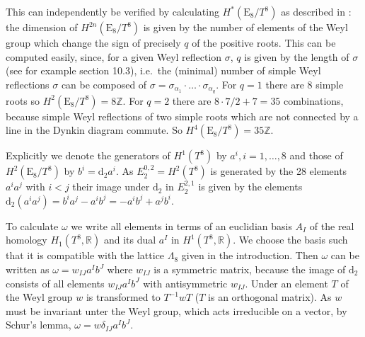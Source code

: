 \documentclass[a4paper,12pt,twoside]{article}
\numberwithin{equation}{section}
\newcommand{\pE}{\text{E}  }     %
\newcommand{\mR}{\mathbb{R}}
\newcommand{\mZ}{\mathbb{Z}}
\newcommand{\Dd}{\text{d}}      %
\begin{document}
This can independently be verified by calculating $H^*(\pE_8/T^8)$ as
described in \cite{Bott}: the dimension of $H^{2n}(\pE_8/T^8)$ is
given by the number of elements of the Weyl group which change the
sign of precisely $q$ of the positive roots. This can be computed
easily, since, for a given Weyl reflection $\sigma$, $q$ is given by
the length of $\sigma$ (see for example \cite{Humphreys} section
10.3), i.e.\ the (minimal) number of simple Weyl reflections $\sigma$
can be composed of $\sigma = \sigma_{\alpha_1} \cdot \ldots \cdot
\sigma_{\alpha_q}$. For $q=1$ there are 8 simple roots so
$H^2(\pE_8/T^8) = 8\mZ$. For $q=2$ there are $8\cdot 7/2 + 7 = 35$
combinations, because simple Weyl reflections of two simple roots which
are not connected by a line in the Dynkin diagram commute. So
$H^4(\pE_8/T^8) = 35\mZ$.

Explicitly we denote the generators of $H^1(T^8)$ by $a^i, i=1,
\ldots, 8$ and those of $H^2(\pE_8/T^8)$ by $b^i = \Dd_2 a^i$. As
$E_2^{0,2} = H^2(T^8)$ is generated by the 28 elements $a^i a^j$ with
$i<j$ their image under $\Dd_2$ in $E_2^{2,1}$ is given by the
elements $\Dd_2 (a^i a^j) = b^i a^j - a^i b^j = - a^i b^j + a^j
b^i$.

To calculate $\omega$ we write all elements in terms of an euclidian
basis $A_I$ of the real homology $H_1(T^8,\mR)$ and its dual $a^I$ in
$H^1(T^8,\mR)$. We choose the basis such that it is compatible with
the lattice $\Lambda_8$ given in the introduction.  Then $\omega$ can
be written as $\omega = w_{IJ} a^I b^J$ where $w_{IJ}$ is a symmetric
matrix, because the image of $\Dd_2$ consists of all elements $w_{IJ}
a^I b^J$ with antisymmetric $w_{IJ}$.  Under an element $T$ of the Weyl
group $w$ is transformed to $T^{-1} w T$ ($T$ is an orthogonal
matrix). As $w$ must be invariant unter the Weyl group, which acts
irreducible on a vector, by Schur's lemma, $\omega= w \delta_{IJ} a^I
b^J$.
\end{document}
